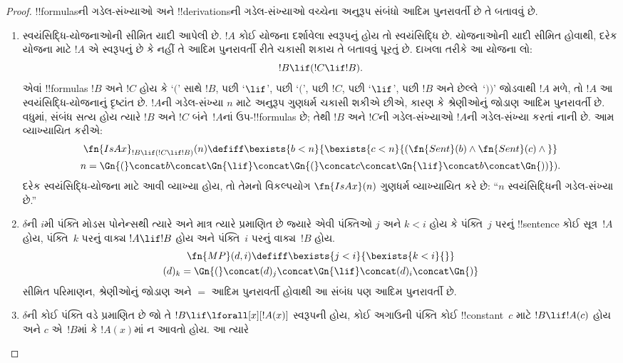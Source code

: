 \documentclass[../../../include/open-logic-section]{subfiles}
\begin{document}
\begin{proof}
!!{formula}sની ગડેલ-સંખ્યાઓ અને
!!{derivation}sની ગડેલ-સંખ્યાઓ વચ્ચેના
અનુરૂપ સંબંધો આદિમ પુનરાવર્તી છે
તે બતાવવું છે.
\begin{enumerate}
\item સ્વયંસિદ્ધિ-યોજનાઓની સીમિત યાદી
  આપેલી છે. $!A$ કોઈ યોજના દર્શાવેલા
  સ્વરૂપનું હોય તો સ્વયંસિદ્ધિ છે.
  યોજનાઓની યાદી સીમિત હોવાથી,
  દરેક યોજના માટે $!A$ એ સ્વરૂપનું
  છે કે નહીં તે આદિમ પુનરાવર્તી રીતે
  ચકાસી શકાય તે બતાવવું પૂરતું છે.
  દાખલા તરીકે આ યોજના લો:
  \[
  !B \lif (!C \lif !B).
  \]
  એવાં !!{formula}s $!B$ અને $!C$
  હોય કે `$($' સાથે $!B$, પછી
  `$\lif$', પછી `$($', પછી $!C$,
  પછી `$\lif$', પછી $!B$ અને
  છેલ્લે~`$))$' જોડવાથી $!A$ મળે,
  તો $!A$ આ સ્વયંસિદ્ધિ-યોજનાનું
  દૃષ્ટાંત છે. $!A$ની ગડેલ-સંખ્યા
  $n$ માટે અનુરૂપ ગુણધર્મ ચકાસી
  શકીએ છીએ, કારણ કે શ્રેણીઓનું
  જોડાણ આદિમ પુનરાવર્તી છે. વધુમાં,
  સંબંધ સત્ય હોય ત્યારે $!B$ અને
  $!C$ બંને~$!A$નાં ઉપ-!!{formula}s
  છે; તેથી $!B$ અને $!C$ની ગડેલ-સંખ્યાઓ
  $!A$ની ગડેલ-સંખ્યા કરતાં નાની
  છે. આમ વ્યાખ્યાયિત કરીએ:
  \begin{multline*}
  \fn{IsAx}_{!B \lif (!C \lif !B)}(n) \defiff \bexists{b< n}{
    \bexists{c < n}{(\fn{Sent}(b) \land \fn{Sent}(c) \land {}}}\\ n =
  \Gn{(} \concat b \concat \Gn{\lif} \concat \Gn{(} \concat c \concat
  \Gn{\lif} \concat b \concat \Gn{))}).
  \end{multline*}
  દરેક સ્વયંસિદ્ધિ-યોજના માટે આવી
  વ્યાખ્યા હોય, તો તેમનો વિકલ્પયોગ
  $\fn{IsAx}(n)$ ગુણધર્મ વ્યાખ્યાયિત
  કરે છે: ``$n$ સ્વયંસિદ્ધિની
  ગડેલ-સંખ્યા છે.''
\item $\delta$ની $i$મી પંક્તિ
  મોડસ પોનેન્સથી ત્યારે અને માત્ર
  ત્યારે પ્રમાણિત છે જ્યારે એવી
  પંક્તિઓ $j$ અને $k < i$ હોય કે
  પંક્તિ~$j$ પરનું !!{sentence}
  કોઈ સૂત્ર~$!A$ હોય, પંક્તિ~$k$
  પરનું વાક્ય $!A \lif !B$ હોય
  અને પંક્તિ~$i$ પરનું વાક્ય~$!B$ હોય.
  \begin{multline*}
    \fn{MP}(d, i) \defiff \bexists{j < i}{\bexists{k < i}{}}\\
    (d)_k = \Gn{(} \concat (d)_j
      \concat \Gn{\lif} \concat (d)_i \concat \Gn{)}
  \end{multline*}
  સીમિત પરિમાણન, શ્રેણીઓનું જોડાણ
  અને $=$ આદિમ પુનરાવર્તી હોવાથી
  આ સંબંધ પણ આદિમ પુનરાવર્તી છે.
\item $\delta$ની કોઈ પંક્તિ
  \QR{} વડે પ્રમાણિત છે જો તે
  $!B \lif \lforall[x][!A(x)]$
  સ્વરૂપની હોય, કોઈ અગાઉની પંક્તિ
  કોઈ !!{constant}~$c$ માટે
  $!B \lif !A(c)$ હોય અને $c$
  એ~$!B$માં કે $!A(x)$માં ન આવતો હોય. આ ત્યારે

\end{enumerate}
\end{proof}
\end{document}
